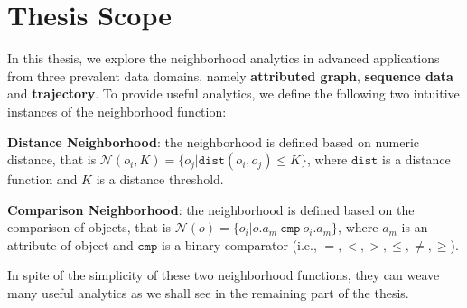 \section{Thesis Scope}
In this thesis, we explore the neighborhood analytics in advanced applications
from three prevalent data domains, namely \textbf{attributed graph},
\textbf{sequence data} and \textbf{trajectory}. 
To provide useful analytics, we define the following
two intuitive instances of the neighborhood function:

\textbf{Distance Neighborhood}: the neighborhood is defined based on numeric distance, that is $\mathcal{N}(o_i,K) = \{o_j | \mathtt{dist}(o_i,o_j) \leq K \}$, where $\mathtt{dist}$ is a distance function and $K$ is a distance threshold.

\textbf{Comparison Neighborhood}: the neighborhood is defined based on the comparison of objects, that is $\mathcal{N}(o) = \{o_i | o.a_m \ \mathtt{cmp} \ o_i.a_m\}$, where $a_m$ is an attribute of object
and $\mathtt{cmp}$ is a binary comparator (i.e., $=,<,>,\leq,\neq,\geq$).

In spite of the simplicity of these two neighborhood functions, they can weave many useful analytics as we shall see in the remaining part of the thesis.
%

%
%
%


